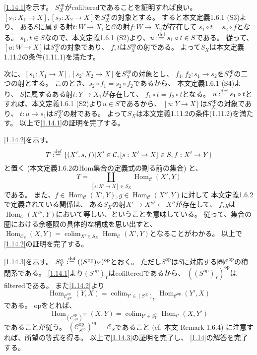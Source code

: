 \documentclass[uplatex,dvipdfmx]{jsarticle}
\makeatletter
\theoremstyle{definition}
\renewenvironment{proof}[1][\proofname]{
  \pushQED{\qed}%
  \normalfont \topsep6\p@\@plus6\p@\relax
  \trivlist
  \item[\hskip\labelsep
    #1\@addpunct{\textbf{.}}]\ignorespaces
}{%
  \popQED\endtrivlist\@endpefalse
}
\providecommand{\proofname}{証明}
\DeclareMathOperator{\Hom}{\mathrm{Hom}}
\newcommand{\op}{\mathrm{op}}
\DeclareMathOperator{\colim}{\mathrm{colim}}
\newcommand\mcC{\mathcal{C}}
\def\dfn{:\overset{\mbox{{\scriptsize def}}}{=}}
\makeatother
\begin{document}
\begin{proof}
  \ref{1.14.1}を示す。
  \(S_X^{\op}\)がcofilteredであることを証明すれば良い。
  \([s_1:X_1\to X], [s_2:X_2\to X]\)を\(S_X^{\op}\)の対象とする。
  すると本文定義1.6.1 (S3)より、
  ある\(S\)に属する射\(t:W\to X_1\)と\(\mcC\)の射\(f:W\to X_2\)が存在して
  \(s_1\circ t = s_2\circ f\)となる。
  \(s_1,t\in S\)なので、本文定義1.6.1 (S2)より、\(u\dfn s_1\circ t\in S\)である。
  従って、\([u:W\to X]\)は\(S_X^{\op}\)の対象であり、
  \(f,t\)は\(S_X^{\op}\)の射である。
  よって\(S_X\)は本文定義1.11.2の条件(1.11.1)を満たす。

  次に、\([s_1:X_1\to X], [s_2:X_2\to X]\)を\(S_X^{\op}\)の対象とし、
  \(f_1,f_2:s_1\to s_2\)を\(S_X^{\op}\)の二つの射とする。
  このとき、\(s_2\circ f_1 = s_2\circ f_2\)であるから、
  本文定義1.6.1 (S4)より、
  \(S\)に属するある射\(t:Y\to X_1\)が存在して、
  \(f_1\circ t = f_2\circ t\)となる。
  \(u\dfn s_1\circ t\)とすれば、本文定義1.6.1 (S2)より\(u\in S\)であるから、
  \([u:Y\to X]\)は\(S_X^{\op}\)の対象であり、
  \(t:u\to s_1\)は\(S_X^{\op}\)の射である。
  よって\(S_X\)は本文定義1.11.2の条件(1.11.2)を満たす。
  以上で\ref{1.14.1}の証明を完了する。

  \ref{1.14.2}を示す。
  \[
  T \dfn \left\{ (X',s,f) \middle| X'\in \mcC, [s:X'\to X]\in S, f:X'\to Y\right\}
  \]
  と置く (本文定義1.6.2のHom集合の定義式の割る前の集合) と、
  \[T = \coprod_{[s:X'\to X]\in S_X}\Hom_{\mcC}(X',Y)\]
  である。
  また、\(f\in \Hom_{\mcC}(X',Y), g\in \Hom_{\mcC}(X'',Y)\)に対して
  本文定義1.6.2で定義されている関係は、
  ある\(S_X\)の射\(X'\to X'''\gets X''\)が存在して、
  \(f,g\)は\(\Hom_{\mcC}(X''',Y)\)において等しい、ということを意味している。
  従って、集合の圏における余極限の具体的な構成を思い出すと、
  \(\Hom_{\mcC_S}(X,Y) = \colim_{X'\in S_X}\Hom_{\mcC}(X',Y)\)となることがわかる。
  以上で\ref{1.14.2}の証明を完了する。

  \ref{1.14.3}を示す。
  \(S_Y^a\dfn ((S^{\op})_Y)^{\op}\)とおく。
  ただし\(S^{\op}\)は\(S\)に対応する圏\(\mcC^{\op}\)の積閉系である。
  \ref{1.14.1}より\((S^{\op})_Y\)はcofilteredであるから、
  \(((S^{\op})_Y)^{\op}\)はfilteredである。
  また\ref{1.14.2}より
  \[\Hom_{\mcC^{\op}_{S^{\op}}}(Y,X) =
  \colim_{Y'\in (S^{\op})_Y}\Hom_{\mcC^{\op}}(Y',X)\]
  である。
  \(\op\)をとれば、
  \[\Hom_{(\mcC^{\op}_{S^{\op}})^{\op}}(X,Y) =
  \colim_{Y'\in S_Y^a}\Hom_{\mcC}(X,Y')\]
  であることが従う。
  \((\mcC^{\op}_{S^{\op}})^{\op} = \mcC_S\)であること
  (cf. 本文 Remark 1.6.4)
  に注意すれば、所望の等式を得る。
  以上で\ref{1.14.3}の証明を完了し、
  \autoref{1.14}の解答を完了する。
\end{proof}
\end{document}
